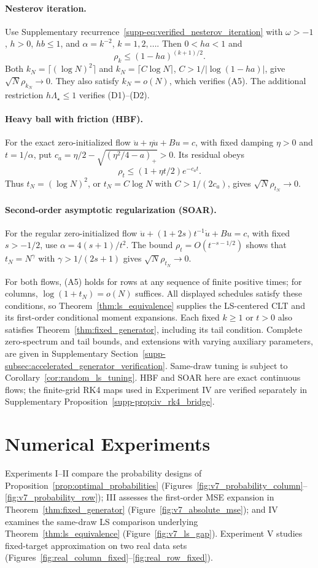 \documentclass[pdflatex,iicol,sn-mathphys-ay]{sn-jnl}
\theoremstyle{thmstyleone}
\theoremstyle{thmstylethree}
\theoremstyle{thmstyletwo}
\begin{document}
\paragraph{Nesterov iteration.}
Use Supplementary recurrence~\eqref{supp-eq:verified_nesterov_iteration} with
$\omega>-1$, $h>0$, $hb\le1$, and $\alpha=k^{-2}$, $k=1,2,\ldots$.
Then $0<ha<1$ and
\[
 \rho_k\le(1-ha)^{(k+1)/2}.
\]
Both $k_N=\lceil(\log N)^2\rceil$ and
$k_N=\lceil C\log N\rceil$, $C>1/|\log(1-ha)|$, give
$\sqrt N\rho_{k_N}\to0$. They also satisfy $k_N=o(N)$, which verifies
(A5). The additional restriction $h\Lambda_\star\le1$ verifies (D1)--(D2).

\paragraph{Heavy ball with friction (HBF).}
For the exact zero-initialized flow $\ddot u+\eta\dot u+Bu=c$,
with fixed damping $\eta>0$ and $t=1/\alpha$, put $c_a=\eta/2-\sqrt{(\eta^2/4-a)_+}>0$. Its residual obeys
\[
 \rho_t\le(1+\eta t/2)e^{-c_at}.
\]
Thus $t_N=(\log N)^2$, or $t_N=C\log N$ with $C>1/(2c_a)$, gives
$\sqrt N\rho_{t_N}\to0$.

\paragraph{Second-order asymptotic regularization (SOAR).}
For the regular zero-initialized flow
$\ddot u+(1+2s)t^{-1}\dot u+Bu=c$, with fixed $s>-1/2$, use
$\alpha=4(s+1)/t^2$. The bound $\rho_t=O(t^{-s-1/2})$ shows that
$t_N=N^\gamma$ with $\gamma>1/(2s+1)$ gives $\sqrt N\rho_{t_N}\to0$.

For both flows, (A5) holds for rows at any sequence of finite positive
times; for columns, $\log(1+t_N)=o(N)$ suffices. All displayed schedules
satisfy these conditions, so Theorem~\ref{thm:ls_equivalence} supplies
the LS-centered CLT and its first-order conditional moment expansions.
Each fixed $k\ge1$ or $t>0$ also satisfies
Theorem~\ref{thm:fixed_generator}, including its tail condition.
Complete zero-spectrum and tail bounds, and extensions with varying
auxiliary parameters, are given in Supplementary
Section~\ref{supp-subsec:accelerated_generator_verification}.
Same-draw tuning is subject to Corollary~\ref{cor:random_ls_tuning}.
HBF and SOAR here are exact continuous flows; the finite-grid RK4 maps
used in Experiment IV are verified separately in Supplementary
Proposition~\ref{supp-prop:iv_rk4_bridge}.

\section{Numerical Experiments}
\label{sec:experiments}
Experiments I--II compare the probability designs of
Proposition~\ref{prop:optimal_probabilities} (Figures~\ref{fig:v7_probability_column}--\ref{fig:v7_probability_row});
III assesses the first-order MSE expansion in Theorem~\ref{thm:fixed_generator}
(Figure~\ref{fig:v7_absolute_mse}); and IV examines the same-draw LS comparison
underlying Theorem~\ref{thm:ls_equivalence} (Figure~\ref{fig:v7_ls_gap}).
Experiment V studies fixed-target approximation on two real data sets
(Figures~\ref{fig:real_column_fixed}--\ref{fig:real_row_fixed}).
\end{document}
